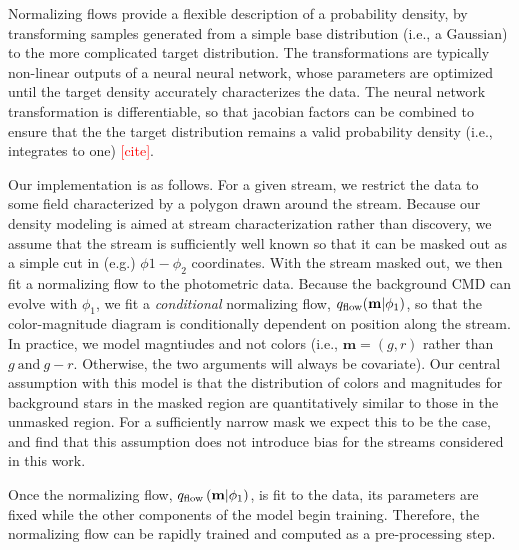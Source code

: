 \documentclass[twocolumn]{aastex631}
\newcommand{\TODO}[1]{{\textcolor{red}{#1}}}
\begin{document}
            Normalizing flows provide a flexible description of a probability density, by transforming samples generated from a simple base distribution (i.e., a Gaussian) to the more complicated target distribution. The transformations are typically non-linear outputs of a neural neural network, whose parameters are optimized until the target density accurately characterizes the data. The neural network transformation is differentiable, so that jacobian factors can be combined to ensure that the the target distribution remains a valid probability density (i.e., integrates to one) \TODO{[cite]}.  

            Our implementation is as follows. For a given stream, we restrict the data to some field characterized by a polygon drawn around the stream. Because our density modeling is aimed at stream characterization rather than discovery, we assume that the stream is sufficiently well known so that it can be masked out as a simple cut in (e.g.) $\phi1-\phi_2$ coordinates. With the stream masked out, we then fit a normalizing flow to the photometric data. Because the background CMD can evolve with $\phi_1$, we fit a \emph{conditional} normalizing flow, $q_{\rm flow}(\mathbf{m}|\phi_1)$, so that the color-magnitude diagram is conditionally dependent on position along the stream. In practice, we model magntiudes and not colors (i.e., $\mathbf{m} = (g,r)$ rather than $g \ \mathrm{and} \ g-r$. Otherwise, the two arguments will always be covariate). Our central assumption with this model is that the distribution of colors and magnitudes for background stars in the masked region are quantitatively similar to those in the unmasked region. For a sufficiently narrow mask we expect this to be the case, and find that this assumption does not introduce bias for the streams considered in this work.
                
            Once the normalizing flow, $q_{\rm flow}\left(\mathbf{m} | \phi_1\right)$, is fit to the data, its parameters are fixed while the other components of the model begin training. Therefore, the normalizing flow can be rapidly trained and computed as a pre-processing step.
\end{document}
